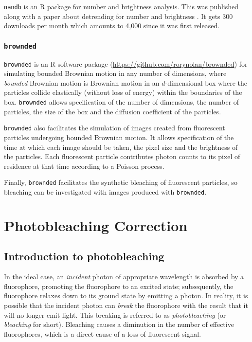 \documentclass[12pt,]{book}
\theoremstyle{definition}
\theoremstyle{definition}
\theoremstyle{definition}
\theoremstyle{remark}
\begin{document}
\texttt{nandb} is an R package for number and brightness analysis. This
was published along with a paper about detrending for number and
brightness \citep{nandb}. It gets 300 downloads per month which amounts
to 4,000 since it was first released.

\subsection{\texorpdfstring{\texttt{brownded}}{brownded}}\label{brownded}

\texttt{brownded} is an R software package
(\url{https://github.com/rorynolan/brownded}) for simulating bounded
Brownian motion in any number of dimensions, where \emph{bounded}
Brownian motion is Brownian motion in an \(d\)-dimensional box where the
particles collide elastically (without loss of energy) within the
boundaries of the box. \texttt{brownded} allows specification of the
number of dimensions, the number of particles, the size of the box and
the diffusion coefficient of the particles.

\texttt{brownded} also facilitates the simulation of images created from
fluorescent particles undergoing bounded Brownian motion. It allows
specification of the time at which each image should be taken, the pixel
size and the brightness of the particles. Each fluorescent particle
contributes photon counts to its pixel of residence at that time
according to a Poisson process.

Finally, \texttt{brownded} facilitates the synthetic bleaching of
fluorescent particles, so bleaching can be investigated with images
produced with \texttt{brownded}.

\chapter{Photobleaching Correction}\label{photobleaching-correction}

\section{Introduction to
photobleaching}\label{introduction-to-photobleaching}

In the ideal case, an \emph{incident} photon of appropriate wavelength
is absorbed by a fluorophore, promoting the fluorophore to an excited
state; subsequently, the fluorophore relaxes down to its ground state by
emitting a photon. In reality, it is possible that the incident photon
can \emph{break} the fluorophore with the result that it will no longer
emit light. This breaking is referred to as \emph{photobleaching} (or
\emph{bleaching} for short). Bleaching causes a diminution in the number
of effective fluorophores, which is a direct cause of a loss of
fluorescent signal.
\end{document}
